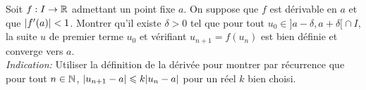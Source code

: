 \documentclass[../main.tex]{subfiles}
\begin{document}
\begin{exo}[D]
Soit $f:I\rightarrow\mathbb R$ admettant un point fixe $a$. On suppose que $f$ est dérivable en $a$ et que $\lvert f'(a)\rvert<1$. Montrer qu'il existe $\delta>0$ tel que pour tout $u_0\in{]a-\delta,a+\delta[}\cap I$, la suite $u$ de premier terme $u_0$ et vérifiant $u_{n+1}=f(u_n)$ est bien définie et converge vers $a$.\\
\textit{Indication:} Utiliser la définition de la dérivée pour montrer par récurrence que pour tout $n\in\mathbb N$, $\lvert u_{n+1}-a\rvert\leqslant k\lvert u_n-a\rvert$ pour un réel $k$ bien choisi.
\end{exo}
\end{document}
